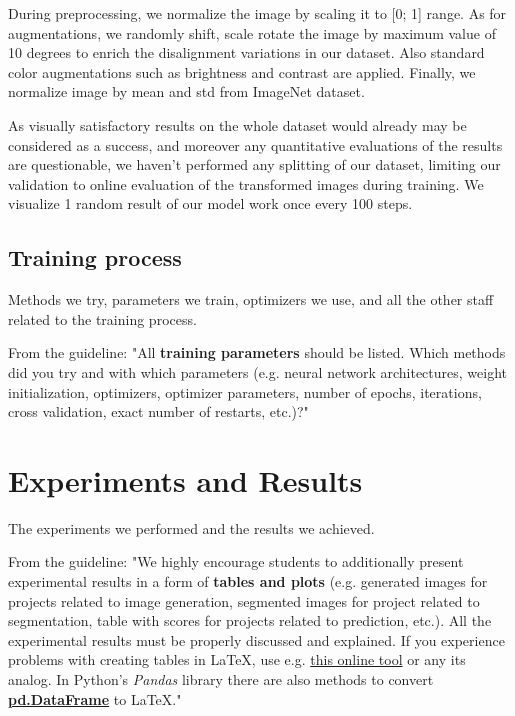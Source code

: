 \documentclass{article}
\begin{document}
During preprocessing, we normalize the image by scaling it to [0; 1] range. As 
for augmentations, we randomly shift, scale rotate the image by maximum value 
of 10 degrees to enrich the disalignment variations in our dataset. Also 
standard color augmentations such as brightness and contrast are applied. 
Finally, we normalize image by mean and std from ImageNet dataset.

As visually satisfactory results on the whole dataset would already may be 
considered as a success, and moreover any quantitative evaluations of the 
results are questionable, we haven't performed any splitting of our dataset, 
limiting our validation to online evaluation of the transformed images during 
training. We visualize 1 random result of our model work once every 100 steps.

\subsection{Training process}
Methods we try, parameters we train, optimizers we use, and all the other staff 
related to the training process.

From the guideline:
"All \textbf{training parameters} should be listed. Which methods did you try 
and with which parameters (e.g. neural network architectures, weight 
initialization, optimizers, optimizer parameters, number of epochs, iterations, 
cross validation, exact number of restarts, etc.)?"

\section{Experiments and Results}\label{experiments_and_results}

The experiments we performed and the results we achieved.

From the guideline: 
"We highly encourage students to additionally present experimental results in a 
form of \textbf{tables and plots} (e.g. generated images for projects related 
to image generation, segmented images for project related to segmentation, 
table with scores for projects related to prediction, etc.). All the 
experimental results must be properly discussed and explained. If you 
experience problems with creating tables in \LaTeX, use e.g. 
\href{https://www.tablesgenerator.com}{this online tool} or any its analog. In 
Python's \textit{Pandas} library there are also methods to convert 
\href{https://pandas.pydata.org/pandas-docs/stable/reference/api/pandas.DataFrame.to_latex.html}{\textbf{pd.DataFrame}} 
to \LaTeX."
\end{document}
